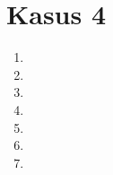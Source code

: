 \documentclass[11pt,a4paper]{article}
\newcommand{\codeListing}[3] {

  


}
\begin{document}
\begin{multicols}{2}
\begin{enumerate}
  \end{enumerate}

  \columnbreak

  \section*{Kasus 4}
  \begin{enumerate}

    \item \codeListing{4}{1}{0.5}

    \item \codeListing{4}{2}{0.5}

    \item \codeListing{4}{3}{0.5}

    \item \codeListing{4}{4}{0.5}

    \item \codeListing{4}{5}{0.5}

    \item \codeListing{4}{6}{0.5}

    \item \codeListing{4}{7}{0.5}

  \end{enumerate}

\end{multicols}

    
\end{document}
